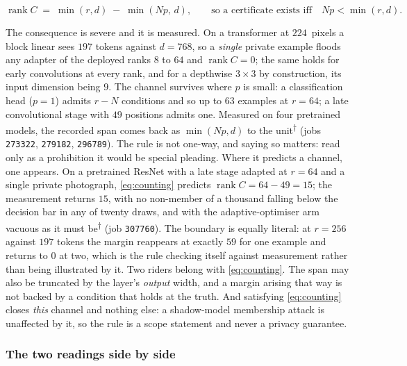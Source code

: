 \begin{equation}\label{eq:counting}
\operatorname{rank}C \;=\; \min(r,d)\;-\;\min(Np,\,d),
\qquad\text{so a certificate exists iff}\quad Np<\min(r,d).
\end{equation}

The consequence is severe and it is measured. On a transformer at
$224$~pixels a block linear sees $197$ tokens against $d=768$, so a
\emph{single} private example floods any adapter of the deployed ranks $8$
to $64$ and $\operatorname{rank}C=0$; the same holds for early convolutions at
every rank, and for a depthwise $3\times3$ by construction, its input
dimension being $9$. The channel survives where $p$ is small: a classification
head ($p=1$) admits $r-N$ conditions and so up to $63$ examples at $r=64$; a
late convolutional stage with $49$ positions admits one. Measured on four
pretrained models, the recorded span comes back as $\min(Np,d)$ to the
unit\textsuperscript{$\dagger$} (jobs \texttt{273322}, \texttt{279182},
\texttt{296789}). The rule is not one-way, and saying so matters: read only as
a prohibition it would be special pleading. Where it predicts a channel, one
appears. On a pretrained ResNet with a late stage adapted at $r=64$ and a
single private photograph, \eqref{eq:counting} predicts
$\operatorname{rank}C=64-49=15$; the measurement returns $15$, with no
non-member of a thousand falling below the decision bar in any of twenty
draws, and with the adaptive-optimiser arm vacuous as it must
be\textsuperscript{$\dagger$} (job \texttt{307760}). The boundary is equally
literal: at $r=256$ against $197$ tokens the margin reappears at exactly $59$
for one example and returns to $0$ at two, which is the rule checking itself
against measurement rather than being illustrated by it. Two riders belong with \eqref{eq:counting}. The span may also
be truncated by the layer's \emph{output} width, and a margin arising that way
is not backed by a condition that holds at the truth. And satisfying
\eqref{eq:counting} closes \emph{this} channel and nothing else: a
shadow-model membership attack is unaffected by it, so the rule is a scope
statement and never a privacy guarantee.

\subsubsection*{The two readings side by side}

